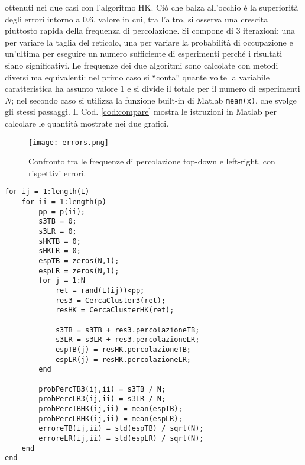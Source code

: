 ottenuti nei due casi con l'algoritmo HK. Ciò che balza all'occhio è la 
superiorità degli errori intorno a $0.6$, valore in cui, tra l'altro, 
si osserva una crescita piuttosto rapida della frequenza di percolazione.
Si compone di 3 iterazioni: una per variare la 
taglia del reticolo, una per variare la probabilità di occupazione e un'ultima per 
eseguire un numero sufficiente di esperimenti perché i risultati siano significativi.
Le frequenze dei due algoritmi sono calcolate con metodi diversi ma equivalenti:
nel primo caso si ``conta'' quante volte la variabile caratteristica ha assunto valore 1
e si divide il totale per il numero di esperimenti $N$; nel secondo caso si utilizza la 
funzione built-in di Matlab \texttt{mean(x)}, che svolge gli stessi passaggi.
Il Cod. \ref{cod:compare} mostra le istruzioni in Matlab per calcolare le quantità 
mostrate nei due grafici. 
\begin{figure}[ht]
    \texttt{[image: errors.png]}
    \caption{Confronto tra le frequenze di percolazione top-down e left-right,
    con rispettivi errori.}
    \label{fig:th_errors}
\end{figure}
\begin{lstlisting}[caption={Porzione di codice relativa al confronto tra algoritmi e 
    alla frequenza di percolazione top-down e left-right.}, label={cod:compare}]
for ij = 1:length(L)
    for ii = 1:length(p)
        pp = p(ii);
        s3TB = 0;
        s3LR = 0;
        sHKTB = 0;
        sHKLR = 0;
        espTB = zeros(N,1);
        espLR = zeros(N,1);
        for j = 1:N
            ret = rand(L(ij))<pp;
            res3 = CercaCluster3(ret);
            resHK = CercaClusterHK(ret);

            s3TB = s3TB + res3.percolazioneTB;
            s3LR = s3LR + res3.percolazioneLR;
            espTB(j) = resHK.percolazioneTB;
            espLR(j) = resHK.percolazioneLR;
        end

        probPercTB3(ij,ii) = s3TB / N;
        probPercLR3(ij,ii) = s3LR / N;
        probPercTBHK(ij,ii) = mean(espTB);
        probPercLRHK(ij,ii) = mean(espLR);
        erroreTB(ij,ii) = std(espTB) / sqrt(N);
        erroreLR(ij,ii) = std(espLR) / sqrt(N);
    end
end
\end{lstlisting}


